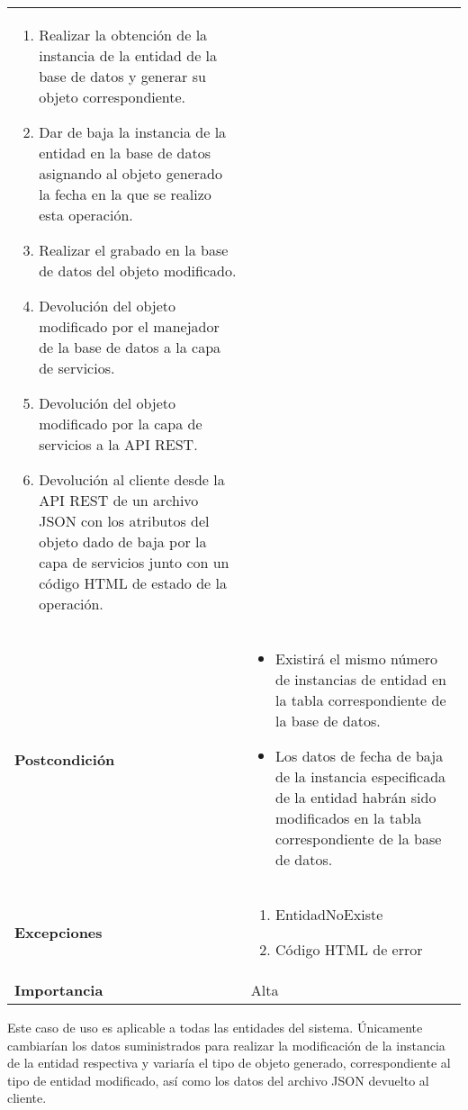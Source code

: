 \begin{longtable}{ p{} p{} }
\begin{enumerate}
        \item Realizar la obtención de la instancia de la entidad de la base de datos y generar su objeto correspondiente.
        \item Dar de baja la instancia de la entidad en la base de datos asignando al objeto generado la fecha en la que se realizo esta operación.
        \item Realizar el grabado en la base de datos del objeto modificado.
        \item Devolución del objeto modificado por el manejador de la base de datos a la capa de servicios.
        \item Devolución del objeto modificado por la capa de servicios a la API REST.
        \item Devolución  al cliente  desde la API REST de un archivo JSON con los atributos del objeto dado de baja por la capa de servicios junto con un código HTML de estado de la operación. 
    \end{enumerate}\\
    \textbf{Postcondición}        & 
        \begin{itemize}
            \item Existirá el mismo número de instancias de entidad en la tabla correspondiente de la base de datos. 
            \item Los datos de fecha de baja de la instancia especificada de la entidad habrán sido modificados en la tabla correspondiente de la base de datos.
        \end{itemize}\\
    \textbf{Excepciones}          & 
        \begin{enumerate}
            \item EntidadNoExiste
            \item Código HTML de error
        \end{enumerate} \\
    \textbf{Importancia}          & Alta \\
    \hline
\end{longtable}


\newpage
Este caso de uso es aplicable a todas las entidades del sistema. Únicamente cambiarían los datos suministrados para realizar la modificación de la instancia de la entidad respectiva y variaría el tipo de objeto generado, correspondiente al tipo de entidad modificado, así como los datos del archivo JSON devuelto al cliente.

